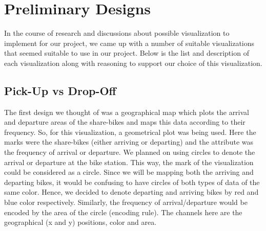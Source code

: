 \section{Preliminary Designs} 
\label{sec:preliminary_designs}

In the course of research and discussions about possible visualization to implement for our project, we came up with a number of suitable visualizations that seemed suitable to use in our project. Below is the list and description of each visualization along with reasoning to support our choice of this visualization.

\subsection{Pick-Up vs Drop-Off}
\label{sec:viz1}

The first design we thought of was a geographical map which plots the arrival and departure areas of the share-bikes and maps this data according to their frequency. So, for this visualization, a geometrical plot was being used. Here the marks were the share-bikes (either arriving or departing) and the attribute was the frequency of arrival or departure. We planned on using circles to denote the arrival or departure at the bike station. This way, the mark of the visualization could be considered as a circle. Since we will be mapping both the arriving and departing bikes, it would be confusing to have circles of both types of data of the same color. Hence, we decided to denote departing and arriving bikes by red and blue color respectively. Similarly, the frequency of arrival/departure would be encoded by the area of the circle (encoding rule). The channels here are the geographical (x and y) positions, color and area. 

